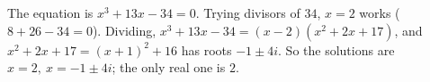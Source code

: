 The equation is $x^3+13x-34=0$. Trying divisors of $34$, $x=2$ works ($8+26-34=0$). Dividing, $x^3+13x-34=(x-2)(x^2+2x+17)$, and $x^2+2x+17=(x+1)^2+16$ has roots $-1\pm4i$. So the solutions are $\boxed{x=2,\ x=-1\pm4i}$; the only real one is $2$.
